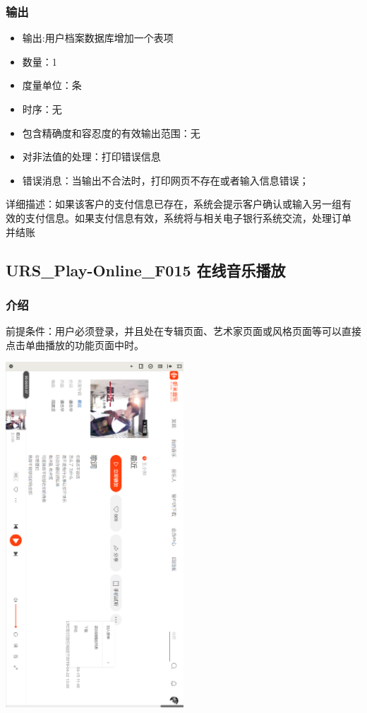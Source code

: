 			\subsubsection{输出}
			\begin{itemize}
				\item	输出:用户档案数据库增加一个表项
				\item	数量：1
				\item	度量单位：条
				\item	时序：无
				\item	包含精确度和容忍度的有效输出范围：无
				\item	对非法值的处理：打印错误信息
				\item	错误消息：当输出不合法时，打印网页不存在或者输入信息错误；
			   \end{itemize}
			   详细描述：如果该客户的支付信息已存在，系统会提示客户确认或输入另一组有
			   效的支付信息。如果支付信息有效，系统将与相关电子银行系统交流，处理订单
			   并结账


		 
			   \subsection{URS\_Play-Online\_F015 在线音乐播放}
		 \subsubsection{介绍}
		 
		 前提条件：用户必须登录，并且处在专辑页面、艺术家页面或风格页面等可以直接点击单曲播放的功能页面中时。
		 \begin{center}
			\begin{sideways} 
		   \includegraphics[width=0.5\textwidth]{./figures/capture14.png} 
			\end{sideways}
		\end{center}
